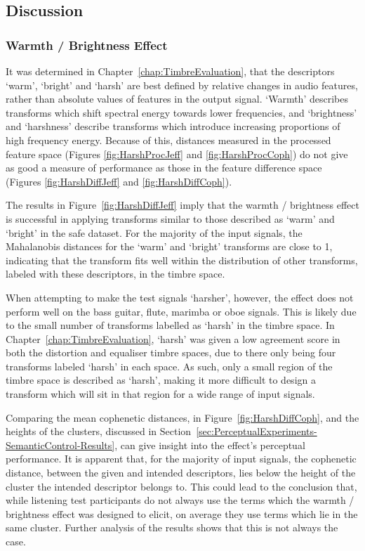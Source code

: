 	\subsection{Discussion}
	\label{sec:PerceptualExperiments-SemanticControl-Discussion}
		\subsubsection*{Warmth / Brightness Effect}
			It was determined in Chapter~\ref{chap:TimbreEvaluation}, that the descriptors `warm', `bright' and
			`harsh' are best defined by relative changes in audio features, rather than absolute values of
			features in the output signal. `Warmth' describes transforms which shift spectral energy towards
			lower frequencies, and `brightness' and `harshness' describe transforms which introduce increasing
			proportions of high frequency energy. Because of this, distances measured in the processed feature
			space (Figures \ref{fig:HarshProcJeff} and \ref{fig:HarshProcCoph}) do not give as good a measure
			of performance as those in the feature difference space (Figures \ref{fig:HarshDiffJeff} and
			\ref{fig:HarshDiffCoph}).

			The results in Figure~\ref{fig:HarshDiffJeff} imply that the warmth / brightness effect is
			successful in applying transforms similar to those described as `warm' and `bright' in the
			\acrshort{safe} dataset. For the majority of the input signals, the Mahalanobis distances for the
			`warm' and `bright' transforms are close to 1, indicating that the transform fits well within the
			distribution of other transforms, labeled with these descriptors, in the timbre space.
			
			When attempting to make the test signals `harsher', however, the effect does not perform well on
			the bass guitar, flute, marimba or oboe signals. This is likely due to the small number of
			transforms labelled as `harsh' in the timbre space. In Chapter~\ref{chap:TimbreEvaluation}, `harsh'
			was given a low agreement score in both the distortion and equaliser timbre spaces, due to there
			only being four transforms labeled `harsh' in each space. As such, only a small region of the
			timbre space is described as `harsh', making it more difficult to design a transform which will sit
			in that region for a wide range of input signals.
			
			Comparing the mean cophenetic distances, in Figure~\ref{fig:HarshDiffCoph}, and the heights of the
			clusters, discussed in Section~\ref{sec:PerceptualExperiments-SemanticControl-Results}, can give
			insight into the effect's perceptual performance. It is apparent that, for the majority of input
			signals, the cophenetic distance, between the given and intended descriptors, lies below the height
			of the cluster the intended descriptor belongs to. This could lead to the conclusion that, while
			listening test participants do not always use the terms which the warmth / brightness effect was
			designed to elicit, on average they use terms which lie in the same cluster. Further analysis of
			the results shows that this is not always the case. 


